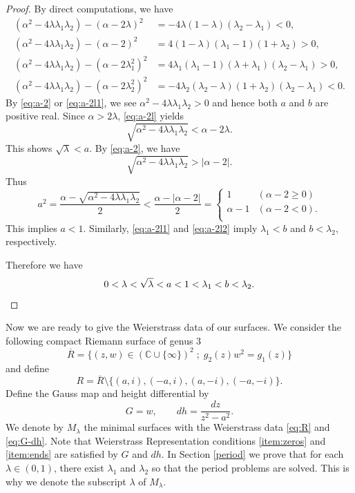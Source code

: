 \documentclass[11pt]{amsart}
\numberwithin{equation}{section}
\numberwithin{figure}{section}
\theoremstyle{plain} %
\theoremstyle{definition} %
\begin{document}
\begin{proof}
By direct computations, we have
\begin{align}
(\alpha^2-4\lambda\lambda_1\lambda_2)-(\alpha-2\lambda)^2 
&=-4\lambda (1-\lambda)(\lambda_2-\lambda_1)<0, 
\label{eq:a-2l} \\
(\alpha^2-4\lambda\lambda_1\lambda_2)-(\alpha-2)^2 
&=4(1-\lambda)(\lambda_1-1)(1+\lambda_2)>0, 
\label{eq:a-2} \\
(\alpha^2-4\lambda\lambda_1\lambda_2)-(\alpha-2\lambda_1^2)^2 
&=4\lambda_1(\lambda_1-1)(\lambda+\lambda_1)(\lambda_2-\lambda_1)>0, 
\label{eq:a-2l1} \\
(\alpha^2-4\lambda\lambda_1\lambda_2)-(\alpha-2\lambda_2^2)^2 
&=-4\lambda_2(\lambda_2-\lambda)(1+\lambda_2)(\lambda_2-\lambda_1)<0.
\label{eq:a-2l2} 
\end{align}
By \eqref{eq:a-2} or \eqref{eq:a-2l1}, 
we see $\alpha^2-4\lambda\lambda_1\lambda_2>0$ 
and hence both $a$ and $b$ are positive real. 
Since $\alpha >2\lambda$, \eqref{eq:a-2l} yields 
\[
\sqrt{\alpha^2-4\lambda\lambda_1\lambda_2} < \alpha-2\lambda . 
\]
This shows $\sqrt{\lambda}<a$. 
By \eqref{eq:a-2}, we have
\[
\sqrt{\alpha^2-4\lambda\lambda_1\lambda_2}>\big|\alpha-2\big|.
\]
Thus
\[
a^2=\frac{\alpha-\sqrt{\alpha^2-4\lambda\lambda_1\lambda_2}}{2}
<\frac{\alpha-\big|\alpha-2\big|}{2}
=\begin{cases}
 1 & (\alpha-2\ge 0) \\
 \alpha -1 & (\alpha -2<0). \\
 \end{cases}
\]
This implies $a<1$.
Similarly, \eqref{eq:a-2l1} and \eqref{eq:a-2l2} imply $\lambda_1<b$ and $b<\lambda_2$, respectively. 

Therefore we have
\begin{equation}\label{eq:const}
0<\lambda<\sqrt{\lambda}<a<1<\lambda_1<b<\lambda_2. 
\qedhere
\end{equation}
\end{proof}

Now we are ready to give the Weierstrass data of our surfaces.  
We consider the following compact Riemann surface of genus 3
\[
\overline{R}=\{(z,w)\in (\mathbb{C}\cup\{\infty\})^2\;;\;g_2(z)w^2=g_1(z)\}
\]
and define
\begin{equation}\label{eq:R}
R=\overline{R}\setminus\{(a,i),(-a,i),(a,-i),(-a,-i)\}. 
\end{equation}
Define the Gauss map and height differential by
\begin{equation}\label{eq:G-dh}
G=w,\qquad dh=\frac{dz}{z^2-a^2}. 
\end{equation}
We denote by $M_\lambda$ the minimal surfaces with the Weierstrass data \eqref{eq:R} and \eqref{eq:G-dh}.  Note that Weierstrass Representation conditions \ref{item:zeros} and \ref{item:ends} are satisfied by $G$ and $dh$. In Section \ref{period} we prove that for each $\lambda\in (0,1)$, there exist $\lambda_1$ and $\lambda_2$ so that the period problems are solved. 
This is why we denote the subscript $\lambda$ of $M_\lambda$. 
\end{document}
